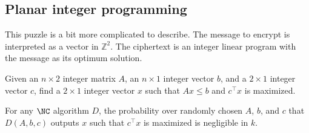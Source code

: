 \documentclass{article}
\newcommand{\Zp}{\mathbb{Z}^*_p}
\begin{document}

\subsection{Planar integer programming}

This puzzle is a bit more complicated to describe.
The message to encrypt is interpreted as a vector in $\mathbb{Z}^2$.
The ciphertext is an integer linear program with the message as its optimum solution.

\begin{definition}
  Given an $n \times 2$ integer matrix $A$, an $n \times 1$ integer vector $b$, and a $2 \times 1$ integer vector $c$, find a $2 \times 1$ integer vector $x$ such that $Ax \leq b$ and $c^\intercal x$ is maximized.
\end{definition}

\begin{assumption}
  For any $\NC$ algorithm $D$, the probability over randomly chosen $A$, $b$, and $c$ that $D(A, b, c)$ outputs $x$ such that $c^\intercal x$ is maximized is negligible in $k$.
\end{assumption}
\end{document}
